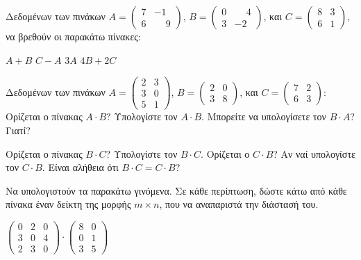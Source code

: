 \documentclass[a4paper,12pt]{article}
\begin{document}
\thispagestyle{empty}

\begin{center}
\end{center}

\vspace{\baselineskip}

\renewcommand{\theenumii}{\roman{enumii}}
\begin{outline}[enumerate]

\1 Δεδομένων των πινάκων $Α=\begin{pmatrix}
7 & -1 \\
6 & \phantom{-}9
\end{pmatrix}$, 
$B=\begin{pmatrix}
0 & \phantom{-}4 \\
3 & -2
\end{pmatrix}$, και 
$
C=\begin{pmatrix}
8 & 3 \\
6 & 1
\end{pmatrix}
$, να βρεθούν οι παρακάτω πίνακες:

\2 $Α+Β$
\2 $C-A$
\2 $3A$
\2 $4B+2C$

\1 Δεδομένων των πινάκων $Α=\begin{pmatrix}
2 & 3 \\
3 & 0 \\
5 & 1 
\end{pmatrix}$, 
$
B=\begin{pmatrix}
2 & 0 \\
3 & 8
\end{pmatrix}
$, και 
$
C=\begin{pmatrix}
7 & 2 \\ 
6 & 3
\end{pmatrix}
$: 
\2 Ορίζεται ο πίνακας $Α\cdot B$? Υπολογίστε τον $Α\cdot B$. Μπορείτε να υπολογίσετε τον $B\cdot A$? Γιατί?

\2 Ορίζεται ο πίνακας $B\cdot C$? Υπολογίστε τον $B\cdot C$. Ορίζεται ο $C\cdot B$? Αν ναί υπολογίστε τον $C\cdot B$. Είναι αλήθεια ότι $B\cdot C=C\cdot B$?

\1 Να υπολογιστούν τα παρακάτω γινόμενα. Σε κάθε περίπτωση, δώστε κάτω από κάθε πίνακα έναν δείκτη της μορφής $m\times n$, που να αναπαριστά την διάστασή του.

\2 $\begin{pmatrix}
0 & 2 & 0 \\
3 & 0 & 4 \\
2 & 3 & 0
\end{pmatrix}\cdot 
\begin{pmatrix}
8 & 0 \\
0 & 1 \\
3 & 5 
\end{pmatrix}
$


\end{outline}
\end{document}
